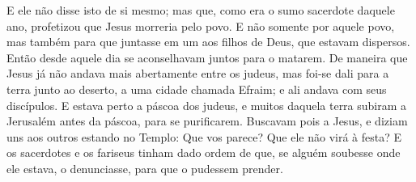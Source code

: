 {  E ele não disse isto de si mesmo; mas que, como era o sumo sacerdote daquele ano, profetizou que Jesus morreria pelo povo.
  E não somente por aquele povo, mas também para que juntasse em um aos filhos de Deus, que estavam dispersos.
  Então desde aquele dia se aconselhavam juntos para o matarem.
  De maneira que Jesus já não andava mais abertamente entre os judeus, mas foi-se dali para a terra junto ao deserto, a uma cidade chamada Efraim; e ali andava com seus discípulos.
  E estava perto a páscoa dos judeus, e muitos daquela terra subiram a Jerusalém antes da páscoa, para se purificarem.
  Buscavam pois a Jesus, e diziam uns aos outros estando no Templo: Que vos parece? Que ele não virá à festa?
  E os sacerdotes e os fariseus tinham dado ordem de que, se alguém soubesse onde ele estava, o denunciasse, para que o pudessem prender.
\par }

